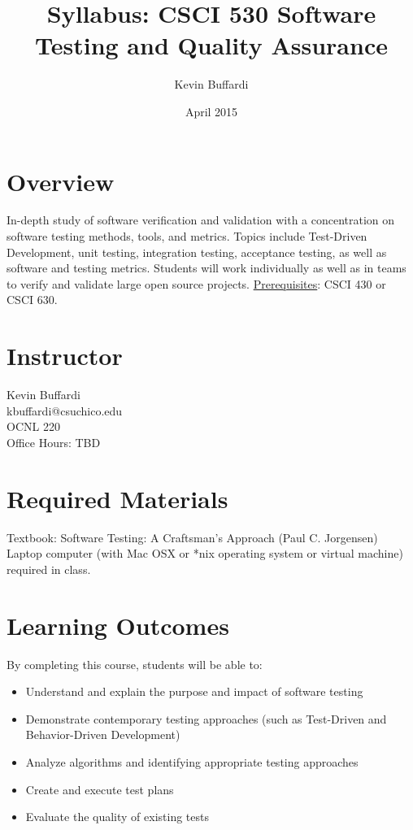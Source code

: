 \documentclass[12pt]{article}
\title{Syllabus: CSCI 530 Software Testing and Quality Assurance}
\author{Kevin Buffardi}
\date{April 2015}
\begin{document}
  \maketitle
  \section*{Overview}	 
  \noindent
  In-depth study of software verification and validation with a concentration on software testing methods, tools, and metrics. Topics include Test-Driven Development, unit testing, integration testing, acceptance testing, as well as software and testing metrics. Students will work individually as well as in teams to verify and validate large open source projects.
  \newline
  \newline
  \underline{Prerequisites}: CSCI 430 or CSCI 630. \\
  
  \section*{Instructor}
  \noindent
  Kevin Buffardi \\
  kbuffardi@csuchico.edu \\
  OCNL 220 \\
  Office Hours: TBD\\

  \section*{Required Materials}
  \noindent
  Textbook: Software Testing: A Craftsman's Approach (Paul C. Jorgensen)
  \newline
  Laptop computer (with Mac OSX or *nix operating system or virtual machine) required in class.

  \section*{Learning Outcomes}
  \noindent
  By completing this course, students will be able to:
  \begin{itemize}
    \item Understand and explain the purpose and impact of software testing
    \item Demonstrate contemporary testing approaches (such as Test-Driven and Behavior-Driven Development)
    \item Analyze algorithms and identifying appropriate testing approaches
    \item Create and execute test plans
    \item Evaluate the quality of existing tests
  \end{itemize}
\end{document}
